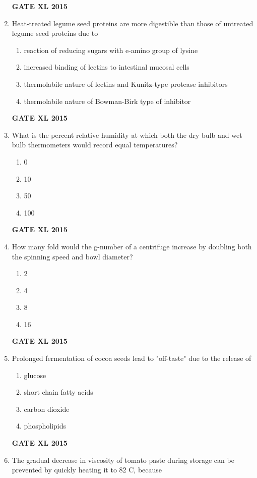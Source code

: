\documentclass[journal,12pt,onecolumn]{IEEEtran}
\begin{document}
\begin{enumerate}
\begin{enumerate}
    \end{enumerate}
\hfill{\textbf{GATE XL 2015}}
\item Heat-treated legume seed proteins are more digestible than those of untreated legume seed proteins due to
    \begin{enumerate}
            \item reaction of reducing sugars with e-amino group of lysine
	    \item increased binding of lectins to intestinal mucosal cells
	    \item thermolabile nature of lectins and Kunitz-type protease inhibitors 
            \item thermolabile nature of Bowman-Birk type of inhibitor
    \end{enumerate}
\hfill{\textbf{GATE XL 2015}}
\item What is the percent relative humidity at which both the dry bulb and wet bulb thermometers would record equal temperatures?
    \begin{enumerate}
            \item 0
	    \item 10
	    \item 50
            \item 100
    \end{enumerate}
\hfill{\textbf{GATE XL 2015}}
\item How many fold would the g-number of a centrifuge increase by doubling both the spinning speed and bowl diameter?
    \begin{enumerate}
            \item 2
	    \item 4
	    \item 8
            \item 16
    \end{enumerate}
\hfill{\textbf{GATE XL 2015}}
\item Prolonged fermentation of cocoa seeds lead to "off-taste" due to the release of
    \begin{enumerate}
            \item glucose
	    \item short chain fatty acids 
	    \item  carbon dioxide
            \item phospholipids
    \end{enumerate}
\hfill{\textbf{GATE XL 2015}}
\item The gradual decrease in viscosity of tomato paste during storage can be prevented by quickly heating it to 82 \degree C, because

\end{enumerate}
\end{document}
